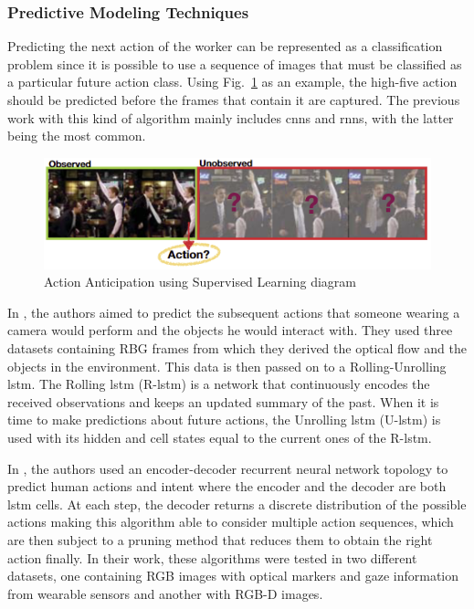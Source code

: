 \subsubsection{Predictive Modeling Techniques}

Predicting the next action of the worker can be represented as a classification problem since it is possible to use a sequence of images that must be classified as a particular future action class. Using Fig.~\ref{superviseddiagram} as an example, the high-five action should be predicted before the frames that contain it are captured. The previous work with this kind of algorithm mainly includes \acp{cnn} and \acp{rnn}, with the latter being the most common.

\begin{figure}[H]
\centerline{\includegraphics[width=6in]{figs/superviseddiagram.PNG}}
\caption[Action Anticipation using Supervised Learning diagram]{Action Anticipation using Supervised Learning diagram\cite{Gammulle2019}}
\label{superviseddiagram}
\end{figure}

In \textcite{Furnari2021}, the authors aimed to predict the subsequent actions that someone wearing a camera would perform and the objects he would interact with. They used three datasets containing RBG frames from which they derived the optical flow and the objects in the environment. This data is then passed on to a Rolling-Unrolling \acs{lstm}. The Rolling \acs{lstm} (R-\acs{lstm}) is a network that continuously encodes the received observations and keeps an updated summary of the past. When it is time to make predictions about future actions, the Unrolling \acs{lstm} (U-\acs{lstm}) is used with its hidden and cell states equal to the current ones of the R-\acs{lstm}.

In \textcite{Schydlo2018}, the authors used an encoder-decoder recurrent neural network topology to predict human actions and intent where the encoder and the decoder are both \acs{lstm} cells. At each step, the decoder returns a discrete distribution of the possible actions making this algorithm able to consider multiple action sequences, which are then subject to a pruning method that reduces them to obtain the right action finally. In their work, these algorithms were tested in two different datasets, one containing RGB images with optical markers and gaze information from wearable sensors and another with RGB-D images.

